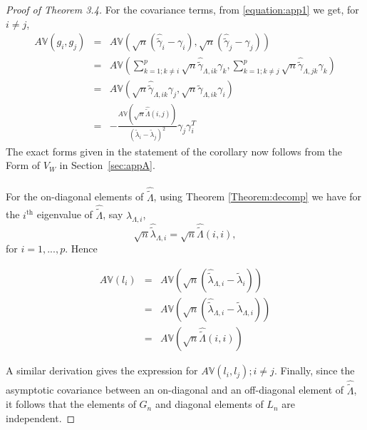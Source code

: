 \documentclass[ejs]{imsart}
\newcommand{\BV}{{\mathbb{V}}}
\theoremstyle{definition} \newtheorem{Definition}[Theorem]{Definition}
\begin{document}
\begin{proof}[Proof of Theorem 3.4]
For the covariance terms, from \eqref{equation:app1} we get, for $i \neq j$,
%
\begin{eqnarray*}
A\BV(g_i, g_j) &=&
A\BV(\sqrt n ( \hat{\tilde \gamma}_{i} - \gamma_i),
\sqrt n ( \hat{\tilde \gamma}_{j} - \gamma_j))\\
&=& A\BV \left(
\sum_{k=1; k \neq i}^p \sqrt n \hat {\tilde \gamma}_{\Lambda,ik} \gamma_k,
\sum_{k=1; k \neq j}^p \sqrt n \hat {\tilde \gamma}_{\Lambda,jk} \gamma_k \right)\\
&=& A\BV \left(
\sqrt n \hat {\tilde \gamma}_{\Lambda,ik} \gamma_j,
\sqrt n \hat {\tilde \gamma}_{\Lambda,ik} \gamma_i \right)\\
&=& - \frac{A\BV(\sqrt n \hat {\tilde \Lambda} (i,j))}
{(\tilde \lambda_i - \tilde \lambda_j)^2} \gamma_j \gamma_i^T
\end{eqnarray*}
%
The exact forms given in the statement of the corollary now follows from the  Form of $V_W$ in Section~\ref{sec:appA}.

\paragraph{}For the on-diagonal elements of $\hat {\tilde \Lambda}$, using Theorem \ref{Theorem:decomp} we have for the $i^\text{th}$ eigenvalue of $\hat {\tilde \Lambda}$, say $\lambda_{\Lambda,i}$,
%
$$ \sqrt n \hat {\tilde \lambda}_{\Lambda,i} = \sqrt n \hat {\tilde \Lambda} (i,i), $$
%
for $i = 1,...,p$. Hence

\begin{eqnarray*}
A\BV(l_i) &=& A\BV( \sqrt n (\hat {\tilde \lambda}_{\Lambda,i} - \tilde \lambda_i) )\\
&=& A\BV( \sqrt n (\hat {\tilde \lambda}_{\Lambda,i} - \tilde \lambda_{\Lambda,i}) )\\
&=& A\BV(\sqrt n \hat {\tilde \Lambda} (i,i))
\end{eqnarray*}

A similar derivation gives the expression for $A\BV(l_i,l_j); i \neq j$. Finally, since the asymptotic covariance between an on-diagonal and an off-diagonal element of $\hat {\tilde \Lambda}$, it follows that the elements of $G_n$ and diagonal elements of $L_n$ are independent.
\end{proof}



\end{document}
